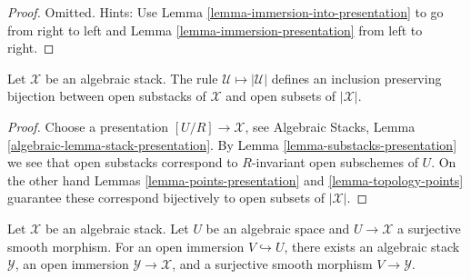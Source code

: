 \begin{proof}
Omitted. Hints: Use
Lemma \ref{lemma-immersion-into-presentation}
to go from right to left and
Lemma \ref{lemma-immersion-presentation}
from left to right.
\end{proof}

\begin{lemma}
\label{lemma-open-substacks}
Let $\mathcal{X}$ be an algebraic stack. The rule
$\mathcal{U} \mapsto |\mathcal{U}|$ defines an inclusion preserving
bijection between open substacks of $\mathcal{X}$ and open subsets
of $|\mathcal{X}|$.
\end{lemma}

\begin{proof}
Choose a presentation $[U/R] \to \mathcal{X}$, see
Algebraic Stacks, Lemma \ref{algebraic-lemma-stack-presentation}.
By
Lemma \ref{lemma-substacks-presentation}
we see that open substacks correspond to $R$-invariant open subschemes
of $U$. On the other hand
Lemmas \ref{lemma-points-presentation} and \ref{lemma-topology-points}
guarantee these correspond bijectively to open subsets of $|\mathcal{X}|$.
\end{proof}

\begin{lemma}
\label{lemma-open-image-substack}
Let $\mathcal X$ be an algebraic stack. Let $U$ be an algebraic space and
$U \to \mathcal X$ a surjective smooth morphism. For an open immersion
$V \hookrightarrow U$, there exists an algebraic stack $\mathcal Y$, an
open immersion $\mathcal Y \to \mathcal X$, and a surjective smooth
morphism $V \to \mathcal Y$. 
\end{lemma}

